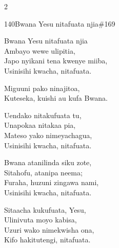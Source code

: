 \begin{multicols}{2}
\begin{hymn}{140}{Bwana Yesu nitafuata njia}{\#169}
\begin{stanza}
Bwana Yesu nitafuata njia\\
Ambayo wewe ulipitia,\\
Japo nyikani tena kwenye miiba,\\
Usinisihi kwacha, nitafuata.
\end{stanza}
\begin{chorus}
Miguuni pako ninajitoa,\\
Kuteseka, kuishi au kufa Bwana.
\end{chorus}
\begin{stanza}
Uendako nitakufuata tu,\\
Unapokaa nitakaa pia,\\
Mateso yako nimeyachagua,\\
Usinisihi kwacha, nitafuata.
\end{stanza}
\begin{stanza}
Bwana atanilinda siku zote,\\
Sitahofu, atanipa neema;\\
Furaha, huzuni zingawa nami,\\
Usinisihi kwacha, nitafuata.
\end{stanza}
\begin{stanza}
Sitaacha kukufuata, Yesu,\\
Ulinivuta moyo kabisa,\\
Uzuri wako nimekwisha ona,\\
Kifo hakitutengi, nitafuata.
\end{stanza}
\end{hymn}


\end{multicols}
